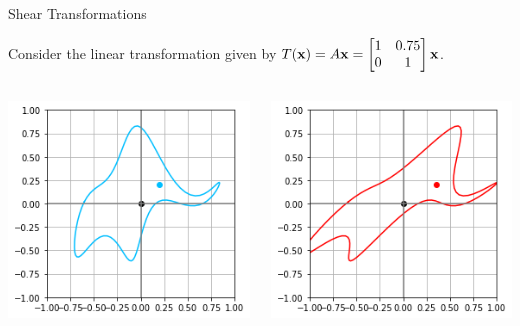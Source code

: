 \documentclass[xcolor=dvipsnames,aspectratio=169,t]{beamer}
\begin{document}
\begin{frame}{Shear Transformations}

Consider the linear transformation given by $\displaystyle T(\mathbf{x}) = A \mathbf{x} = \begin{bmatrix} 1 & 0.75 \\ 0 & 1 \end{bmatrix}\mathbf{x}$. 


\begin{columns}

\column{0.5\tw}

\begin{center}
\includegraphics[width=0.6\tw]{images/fig-elephant.png}
\end{center}

\column{0.5\tw}

\begin{center}
\includegraphics[width=0.6\tw]{images/fig-ele-shear.png}
\end{center}

\end{columns}

\end{frame}
\end{document}
